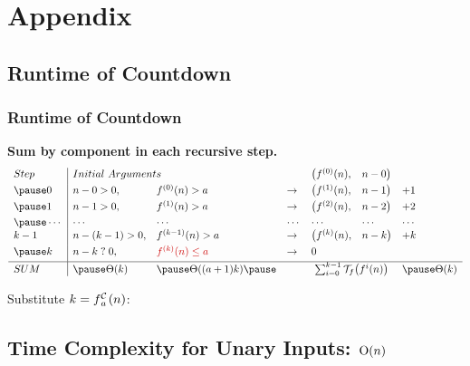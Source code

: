 \section{Appendix}

\subsection{Runtime of Countdown}
\begin{frame}
\frametitle{Runtime of Countdown}

\textbf{Sum by component in each recursive step.}
\begin{equation*}
\begin{array}{l|llllll}
Step & \multicolumn{2}{l}{Initial \ Arguments} &  & \big(f^{(0)}(n), & n - 0 \big) &  \\[3pt]
\pause 0    & n - 0 > 0,     & f^{(0)}(n) > a & \to & \big(f^{(1)}(n), & n - 1\big) & + 1 \\[3pt]
\pause 1    & n - 1 > 0, & f^{(1)}(n) > a & \to & \big(f^{(2)}(n), & n - 2\big) & + 2 \\[3pt]
\pause \cdots & \cdots & \cdots & \cdots & \cdots & \cdots & \cdots \\
k-1  & n - (k-1) > 0, & f^{(k-1)}(n) > a & \to & \big(f^{(k)}(n), & n - k\big) & + k \\[3pt]
\pause k & n - k \mathrel{?} 0, & {\color{red} f^{(k)}(n) \le a}  &\to & \multicolumn{2}{l}{0} &  \\[3pt] \hline
SUM & \pause \Theta(k) & \pause \Theta((a+1)k) \pause & &  \multicolumn{2}{c}{\sum_{i=0}^{k-1}\runtime_f\big(f^{i}(n)\big)} & \pause \Theta(k)
\end{array}
\end{equation*}


\pause
Substitute $k = \cdt{f}{a}(n)$:
\end{frame}


\subsection{Time Complexity for Unary Inputs: $\text{O}(n)$}

